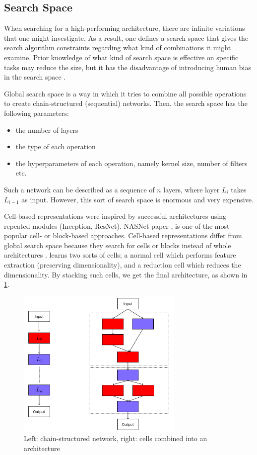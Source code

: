 \subsection{Search Space}
When searching for a high-performing architecture, there are infinite variations that one might investigate. As a result, one defines a search space that gives the search algorithm constraints regarding what kind of combinations it might examine. Prior knowledge of what kind of search space is effective on specific tasks may reduce the size, but it has the disadvantage of introducing human bias in the search space \autocite{elsken2019neural}.  

Global search space is a way in which it tries to combine all possible operations to create chain-structured (sequential) networks. Then, the search space has the following parameters:
\begin{itemize}
    \item the number of layers
    \item the type of each operation
    \item the hyperparameters of each operation, namely kernel size, number of filters etc. 
\end{itemize}

Such a network can be described as a sequence of $n$ layers, where layer $L_i$ takes $L_{i-1}$ as input. However, this sort of search space is enormous and very expensive. 

Cell-based representations were inspired by successful architectures using repeated modules (Inception, ResNet). NASNet paper \autocite{DBLP:journals/corr/ZophVSL17}, is one of the most popular cell- or block-based approaches. Cell-based representations differ from global search space because they search for cells or blocks instead of whole architectures \autocite{elsken2019neural}. \cite{DBLP:journals/corr/ZophVSL17} learns two sorts of cells; a normal cell which performs feature extraction (preserving dimensionality), and a reduction cell which reduces the dimensionality. By stacking such cells, we get the final architecture, as shown in \cref{fig:cells}. 

\clearpage

\begin{figure}
    \centering
    \includegraphics[width=8cm]{figures/cells.png}
    \caption{Left: chain-structured network, right: cells combined into an architecture}
    \label{fig:cells}
\end{figure}

